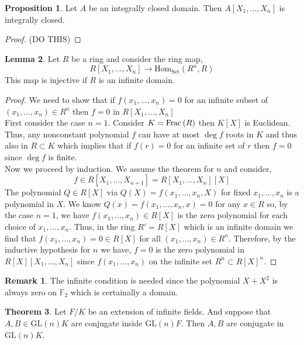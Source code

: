 \documentclass[12pt]{extarticle}
\newcommand{\Hom}[3]{\mathrm{Hom}_{#1}\left( #2, #3 \right)}
\theoremstyle{definition}
\newtheorem{theorem}{Theorem}[section]
\newtheorem{lemma}[theorem]{Lemma}
\newtheorem{proposition}[theorem]{Proposition}
\newtheorem{remark}{Remark}
\newcommand{\GL}[1]{\mathrm{GL}\left(#1\right)}
\begin{document}
\begin{proposition}
Let $A$ be an integrally closed domain. Then $A[X_1, \dots, X_n]$ is integrally closed.
\end{proposition}

\begin{proof}
(DO THIS)
\end{proof}

\begin{lemma}
Let $R$ be a ring and consider the ring map,
\[ R[X_1, \dots, X_n] \to \Hom{\mathrm{Set}}{R^n}{R} \]
This map is injective if $R$ is an infinite domain. 
\end{lemma}

\begin{proof}
We need to show that if $f(x_1, \dots, x_n) = 0$ for an infinite subset of $(x_1, \dots, x_n) \in R^n$ then $f = 0$ in $R[X_1, \dots, X_n]$
\bigskip\\
First consider the case $n = 1$.
Consider $K = \mathrm{Frac}\left( R \right)$ then $K[X]$ is Euclidean. Thus, any nonconstant polynomial $f$ can have at most $\deg{f}$ roots in $K$ and thus also in $R \subset K$ which implies that if $f(r) = 0$ for an infinite set of $r$ then $f = 0$ since $\deg{f}$ is finite.
\bigskip\\
Now we proceed by induction. We assume the theorem for $n$ and consider,
\[ f \in R[X_1, \dots, X_{n+1}] = R[X_1, \dots, X_{n}][X] \]
The polynomial $Q \in R[X]$ via $Q(X) = f(x_1, \dots, x_n, X)$ for fixed $x_1, \dots, x_n$ is a polynomial in $X$. We know $Q(x) = f(x_1, \dots, x_n, x) = 0$ for any $x \in R$ so, by the case $n = 1$, we have $f(x_1, \dots, x_n) \in R[X]$ is the zero polynomial for each choice of $x_1, \dots, x_n$. Thus, in the ring $R' = R[X]$ which is an infinite domain we find that $f(x_1, \dots, x_n) = 0 \in R[X]$ for all $(x_1, \dots, x_n) \in R^n$. Therefore, by the inductive hypothesis for $n$ we have, $f = 0$ is the zero polynomial in $R[X][X_1, \dots, X_n]$ since $f(x_1, \dots, x_n)$ on the infinite set $R^n \subset R[X]^n$.   
\end{proof}

\begin{remark}
The infinite condition is needed since the polynomial $X + X^2$ is always zero on $\mathbb{F}_2$ which is certainally a domain. 
\end{remark}

\begin{theorem}
Let $F / K$ be an extension of infinite fields. And suppose that $A,B \in \GL{n}{K}$ are conjugate inside $\GL{n}{F}$. Then $A,B$ are conjugate in $\GL{n}{K}$.
\end{theorem}
\end{document}
